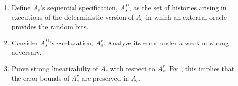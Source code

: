 \begin{enumerate}
  
  
  \item Define $A_s$'s sequential specification, $A^D_s$, as   the set of histories arising in executions of the  
  deterministic   version of  $A_s$ in which an external oracle provides the random bits.  

   \item Consider $A^D_s$'s $r$-relaxation, $A^r_s$. 
   Analyze its error  under a weak or strong adversary. 
  
  \item Prove strong linearizabilty of $A_c$  with respect to $A^r_s$. 
  By~\cite{Wojciech}, this implies that the error bounds of  $A^r_s$ are preserved in $A_c$.
  
    
\end{enumerate}
